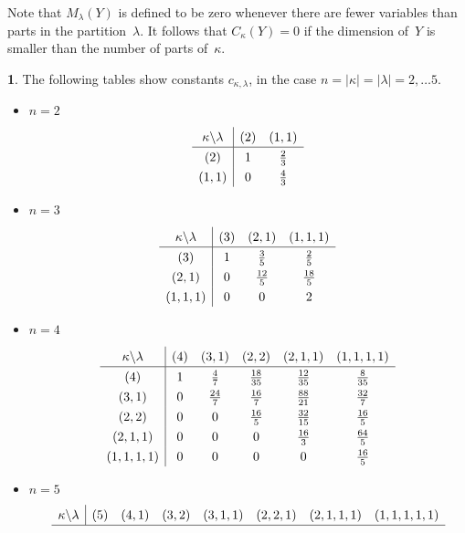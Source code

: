 \documentclass[10pt,oneside,american]{amsart}
\numberwithin{equation}{section}
\numberwithin{figure}{section}
\theoremstyle{plain}
\theoremstyle{definition}
\theoremstyle{remark}
\theoremstyle{plain}
\theoremstyle{definition}
\newtheorem{example}[thm]{\protect\examplename}
\theoremstyle{plain}
\theoremstyle{plain}
\providecommand{\examplename}{Example}
\begin{document}
Note that $M_\lambda(Y)$ is defined to be zero whenever there are fewer variables
than parts in the partition~$\lambda$. It follows that $C_{\kappa}(Y)=0$ if the
dimension of~$Y$ is smaller than the number of parts of~$\kappa$.
\begin{example}
\label{Tables}The following tables \cite[pp.~238]{Muirhead} show
constants $c_{\kappa,\lambda}$, in the case $n=\left|\kappa\right|=\left|\lambda\right|=2,\ldots5$. 
\begin{itemize}
\item $n=2$
\[
\def\arraystretch{1.3}
\begin{array}{c|cc}
\kappa\backslash\lambda & \left(2\right) & \left(1,1\right)\\ \hline
\left(2\right) & 1 & \frac{2}{3}\\
\left(1,1\right) & 0 & \frac{4}{3}
\end{array}
\]
\item $n=3$
\[
\def\arraystretch{1.3}
\begin{array}{c|ccc}
\kappa\backslash\lambda & \left(3\right) & \left(2,1\right) & \left(1,1,1\right)\\ \hline
\left(3\right) & 1 & \frac{3}{5} & \frac{2}{5}\\
\left(2,1\right) & 0 & \frac{12}{5} & \frac{18}{5}\\
\left(1,1,1\right) & 0 & 0 & 2
\end{array}
\]
\item $n=4$
\[
\def\arraystretch{1.3}
\begin{array}{c|ccccc}
\kappa\backslash\lambda & \left(4\right) & \left(3,1\right) & \left(2,2\right) & \left(2,1,1\right) & \left(1,1,1,1\right)\\ \hline
\left(4\right) & 1 & \frac{4}{7} & \frac{18}{35} & \frac{12}{35} & \frac{8}{35}\\
\left(3,1\right) & 0 & \frac{24}{7} & \frac{16}{7} & \frac{88}{21} & \frac{32}{7}\\
\left(2,2\right) & 0 & 0 & \frac{16}{5} & \frac{32}{15} & \frac{16}{5}\\
\left(2,1,1\right) & 0 & 0 & 0 & \frac{16}{3} & \frac{64}{5}\\
\left(1,1,1,1\right) & 0 & 0 & 0 & 0 & \frac{16}{5}
\end{array}
\]
\item $n=5$
\[
\def\arraystretch{1.3}
\begin{array}{c|ccccccc}
\kappa\backslash\lambda & \left(5\right) & \left(4,1\right) & \left(3,2\right) & \left(3,1,1\right) & \left(2,2,1\right) & \left(2,1,1,1\right) & \left(1,1,1,1,1\right)\\ \hline

\end{array}\]
\end{itemize}
\end{example}
\end{document}
